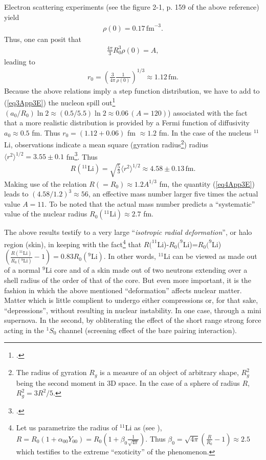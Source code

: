 \begin{subappendices}
Electron scattering experiments (see the figure 2-1, p. 159 of the above reference) yield
\begin{align}
\rho(0)=0.17\,\text{fm}^{-3}.
\end{align}
Thus, one can posit that
\begin{align}
\frac{4\pi}{3}R_0^3\rho(0)=A,
\end{align}
leading to
\begin{align}\label{eq3App3E}
r_0=\left(\frac{3}{4\pi}\frac{1}{\rho(0)}\right)^{1/3}\approx 1.12\,\text{fm}.
\end{align}
Because the above relations imply a step function distribution, we have to add to (\ref{eq3App3E}) the nucleon spill out\footnote{\cite{Bertsch:05}.} $(a_0/R_0)\ln 2\approx (0.5/5.5)\ln 2\approx 0.06\, (A=120)$) associated with the fact that a more realistic distribution is provided by a Fermi function of diffusivity $a_0\approx 0.5$ fm. Thus $r_0=(1.12+0.06)$ fm $\approx 1.2$ fm. In the case of the nucleus $^{11}$Li, observations indicate a mean square (gyration radius\footnote{The radius of gyration $R_g$ is a measure of an object of arbitrary shape, $R^2_g$ being the second moment in 3D space. In the case of a sphere of radius $R$, $R^2_g=3R^2/5$.}) radius $\langle r^2\rangle^{1/2}=3.55\pm 0.1$ fm\footnote{\cite{Kobayashi:89}.}. Thus
\begin{align}\label{eq4App3E}
R(^{11}\text{Li})=\sqrt{\frac{5}{3}}\langle r^2\rangle^{1/2}\approx 4.58\pm 0.13\,\text{fm}.
\end{align}
Making use of the relation $R(=R_0)\approx1.2 A^{1/3}$ fm, the quantity (\ref{eq4App3E}) leads to $(4.58/1.2)^3\approx56$, an effective mass number larger five times the actual value $A=11$. To be noted that the actual mass number predicts a ``systematic'' value of the nuclear radius $R_0(^{11}\text{Li})\approx 2.7$ fm.


The above results testify to a very large ``\emph{isotropic radial deformation}'', or halo region (skin), in keeping with the fact\footnote{Let us  parametrize the radius of $^{11}$Li as (see \cite{Bohr:75}), $R=R_0(1+\alpha_{00}Y_{00})=R_0(1+\beta_{0}\frac{1}{\sqrt{4\pi}})$. Thus $\beta_0=\sqrt{4\pi}(\frac{R}{R_0}-1)\approx 2.5$ which testifies to the extreme ``exoticity'' of the phenomenon.} that $R(^{11}$Li)-$R_0(^{9}$Li)=$R_0(^{9}$Li)$(\frac{R(^{11}\text{Li})}{R_0(^9\text{Li})}-1)=0.83R_0(^9\text{Li})$. In other words, $^{11}$Li can be viewed as made out of a normal $^{9}$Li core and of a skin made out of two neutrons   extending over a shell radius of the order of that of the core. But even more important, it is the fashion in which the above mentioned ``deformation'' affects nuclear matter. Matter  which is little complient to undergo either compressions or, for that sake, ``depressions'', without resulting in nuclear instability. In one case, through a mini supernova. In the second, by obliterating the effect of the short range strong force acting in the $^1S_0$ channel (screening effect of the bare pairing interaction).



\end{subappendices}
